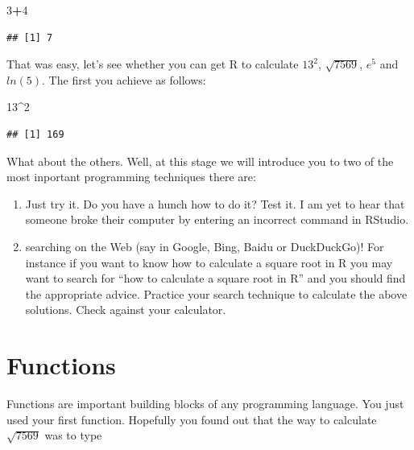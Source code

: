 \documentclass[
]{article}
\newenvironment{Shaded}{\begin{snugshade}}{\end{snugshade}}
\newcommand{\DecValTok}[1]{\textcolor[rgb]{0.00,0.00,0.81}{#1}}
\newcommand{\SpecialCharTok}[1]{\textcolor[rgb]{0.81,0.36,0.00}{\textbf{#1}}}
\providecommand{\tightlist}{%
  \setlength{\itemsep}{0pt}\setlength{\parskip}{0pt}}
\begin{document}
\begin{Shaded}
\begin{Highlighting}[]
\DecValTok{3}\SpecialCharTok{+}\DecValTok{4}
\end{Highlighting}
\end{Shaded}

\begin{verbatim}
## [1] 7
\end{verbatim}

That was easy, let's see whether you can get R to calculate \(13^2\),
\(\sqrt{7569}\), \(e^{5}\) and \(ln(5)\). The first you achieve as
follows:

\begin{Shaded}
\begin{Highlighting}[]
\DecValTok{13}\SpecialCharTok{\^{}}\DecValTok{2}
\end{Highlighting}
\end{Shaded}

\begin{verbatim}
## [1] 169
\end{verbatim}

What about the others. Well, at this stage we will introduce you to two
of the most inportant programming techniques there are:

\begin{enumerate}
\def\labelenumi{\arabic{enumi}.}
\tightlist
\item
  Just try it. Do you have a hunch how to do it? Test it. I am yet to
  hear that someone broke their computer by entering an incorrect
  command in RStudio.
\item
  searching on the Web (say in Google, Bing, Baidu or DuckDuckGo)! For
  instance if you want to know how to calculate a square root in R you
  may want to search for ``how to calculate a square root in R'' and you
  should find the appropriate advice. Practice your search technique to
  calculate the above solutions. Check against your calculator.
\end{enumerate}

\hypertarget{functions}{%
\section{Functions}\label{functions}}

Functions are important building blocks of any programming language. You
just used your first function. Hopefully you found out that the way to
calculate \(\sqrt{7569}\) was to type
\end{document}
